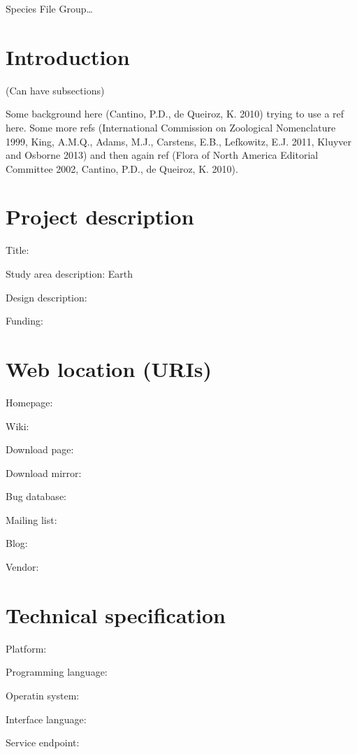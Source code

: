 \documentclass[
]{article}
\begin{document}
Species File Group\ldots{}

\hypertarget{introduction}{%
\section{Introduction}\label{introduction}}

(Can have subsections)

Some background here (Cantino, P.D., de Queiroz, K. 2010) trying to use
a ref here. Some more refs (International Commission on Zoological
Nomenclature 1999, King, A.M.Q., Adams, M.J., Carstens, E.B., Lefkowitz,
E.J. 2011, Kluyver and Osborne 2013) and then again ref (Flora of North
America Editorial Committee 2002, Cantino, P.D., de Queiroz, K. 2010).

\hypertarget{project-description}{%
\section{Project description}\label{project-description}}

Title:

Study area description: Earth

Design description:

Funding:

\hypertarget{web-location-uris}{%
\section{Web location (URIs)}\label{web-location-uris}}

Homepage:

Wiki:

Download page:

Download mirror:

Bug database:

Mailing list:

Blog:

Vendor:

\hypertarget{technical-specification}{%
\section{Technical specification}\label{technical-specification}}

Platform:

Programming language:

Operatin system:

Interface language:

Service endpoint:
\end{document}
